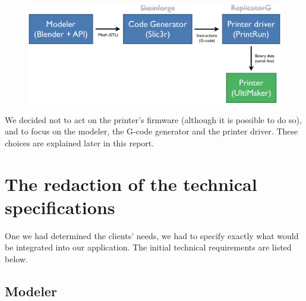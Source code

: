 \documentclass{report}
\begin{document}
\bigskip

\begin{figure}[!h]

\begin{center}
	\includegraphics[width=.7\textwidth]{schema}
\end{center}

\end{figure}

We decided not to act on the printer's firmware (although it is possible to do so), and to focus on the modeler, the G-code generator and the printer driver. These choices are explained later in this report. 

\section{The redaction of the technical specifications}

One we had determined the clients' needs, we had to specify exactly what would be integrated into our application. The initial technical requirements are listed below.

\subsection{Modeler}

\bigskip
\end{document}
